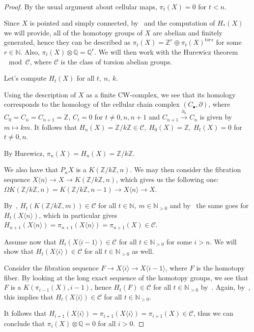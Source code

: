 \documentclass{article}
\newcommand{\numberset}{\mathbb}
\newcommand{\N}{\numberset{N}}
\newcommand{\Z}{\numberset{Z}}
\newcommand{\Q}{\numberset{Q}}
\newcommand{\exercise}[1]{\noindent {\bf Exercise #1}}
\begin{document}
~\\
\exercise{3}

\begin{proof}    
    By the usual argument about cellular maps, $\pi_t(X)=0$ for $t<n$.
    
    Since $X$ is pointed and simply connected, by~\cite[thm. 12.1]{HM19} and the
    computation of $H_*(X)$ we will provide,
    all of the homotopy groups of $X$ are abelian and finitely generated, hence
    they can be described as $\pi_t(X)=\Z^r\oplus\pi_t(X)^{tors}$ for some
    $r\in\N$. Also, $\pi_t(X)\otimes\Q=\Q^r$. We will then work with the
    Hurewicz theorem$\mod\mathcal{C}$, where $\mathcal{C}$ is the class of
    torsion abelian groups.
    
    Let's compute $H_t(X)$ for all $t,\ n,\ k$.

    Using the description of $X$ as a finite CW-complex, we see that its
    homology corresponds to the homology of the cellular chain complex
    $(C_\bullet,\partial)$, where $C_0=C_n=C_{n+1}=\Z$, $C_t=0$ for
    $t\neq 0,n,n+1$ and $C_{n+1}\xrightarrow{\partial_n}C_n$ is given by
    $m\mapsto km$. It follows that $H_n(X)=\Z/k\Z\in\mathcal{C},\ H_0(X)=\Z,\
    H_t(X)=0$ for $t\neq 0,n$.

    By Hurewicz, $\pi_n(X)=H_n(X)=\Z/k\Z$.

    We also have that $P_nX$ is a $K(\Z/k\Z,n)$. We may then consider the
    fibration sequence $X\langle n\rangle\rightarrow X\rightarrow K(\Z/k\Z,n)$,
    which gives us the following one: $\Omega
    K(\Z/k\Z,n)=K(\Z/k\Z,n-1)\rightarrow X\langle n\rangle\rightarrow X$.

    By~\cite[lemma 13.16]{HM19}, $H_t(K(\Z/k\Z,m))\in\mathcal{C}$ for all
    $t\in\N,\ m\in\N_{>0}$ and by~\cite[lemma 13.15]{HM19} the same goes for
    $H_t(X\langle n\rangle)$, which in particular gives
    $H_{n+1}(X\langle n\rangle)=\pi_{n+1}(X\langle
    n\rangle)=\pi_{n+1}(X)\in\mathcal{C}$.

    Assume now that $H_t(X\langle i-1\rangle)\in\mathcal{C}$ for all
    $t\in\N_{>0}$ for some $i>n$. We will show that $H_t(X\langle
    i\rangle)\in\mathcal{C}$ for all $t\in\N_{>0}$ as well.

    Consider the fibration sequence $F\rightarrow X\langle i\rangle\rightarrow
    X\langle i-1\rangle$, where $F$ is the homotopy fiber. By looking at the
    long exact sequence of the homotopy groups, we see that $F$ is a
    $K(\pi_{i-1}(X),i-1)$, hence $H_t(F)\in\mathcal{C}$ for all $t\in\N_{>0}$
    by~\cite[lemma 13.16]{HM19}. Again, by~\cite[lemma 13.15]{HM19}, this
    implies that $H_t(X\langle i\rangle)\in\mathcal{C}$ for all $t\in\N_{>0}$.
    
    It follows that $H_{i+1}(X\langle i\rangle)=\pi_{i+1}(X\langle
    i\rangle)=\pi_{i+1}(X)\in\mathcal{C}$, thus we can conclude that
    $\pi_i(X)\otimes\Q=0$ for all $i>0$.
\end{proof}

\printbibliography
\end{document}

